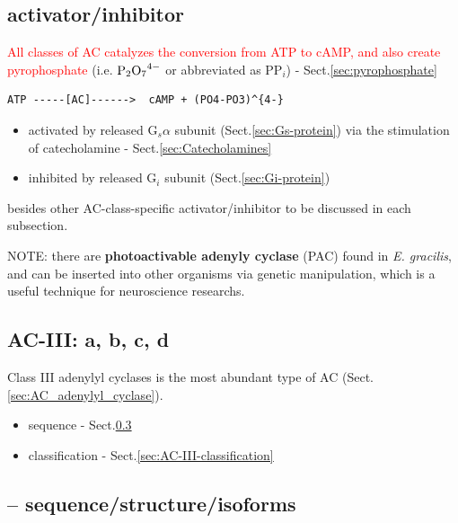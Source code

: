 \subsection{activator/inhibitor}

\textcolor{red}{All classes of AC catalyzes the conversion from ATP to cAMP,
and also create pyrophosphate} (i.e. $\ce{P2O7^{4-}}$ or abbreviated as PP$_i$)
- Sect.\ref{sec:pyrophosphate}
\begin{verbatim}
ATP -----[AC]------>  cAMP + (PO4-PO3)^{4-}
\end{verbatim}

\begin{itemize}

  \item activated by released G$_s\alpha$ subunit (Sect.\ref{sec:Gs-protein})
  via the stimulation of catecholamine - Sect.\ref{sec:Catecholamines}
  
  \item inhibited by released G$_i$ subunit (Sect.\ref{sec:Gi-protein})

\end{itemize}
besides other AC-class-specific activator/inhibitor to be discussed in each
subsection.


\begin{mdframed}
NOTE: there are {\bf photoactivable adenyly cyclase} (PAC) found in {\it E.
gracilis}, and can be inserted into other organisms via genetic manipulation,
which is a useful technique for neuroscience researchs.
\end{mdframed}

\subsection{AC-III: a, b, c, d}
\label{sec:AC-III}
\label{sec:adenylyl-cyclase-classIII}

Class III adenylyl cyclases is the most abundant type of
AC (Sect.\ref{sec:AC_adenylyl_cyclase}).  
\begin{itemize}
  \item sequence - Sect.\ref{sec:AC-III-sequence}
  \item classification - Sect.\ref{sec:AC-III-classification}
\end{itemize}

\subsection{-- sequence/structure/isoforms}
\label{sec:AC-III-sequence}
\label{sec:AC-III-catalytic-domains}
\label{sec:AC-III-classification}

